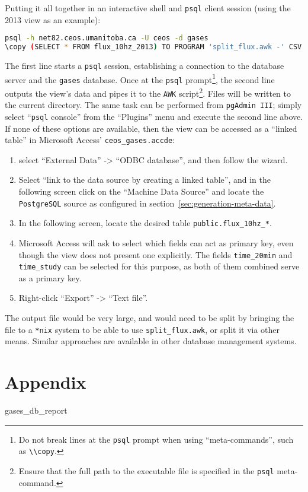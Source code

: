\documentclass[12pt,letterpaper,titlepage,headings=small,numbers=noenddot]%
{scrartcl}
\begin{document}
Putting it all together in an interactive shell and \texttt{psql} client
session (using the 2013 view as an example):

\begin{lstlisting}[language=bash, morekeywords={psql, copy},
backgroundcolor=\color{lightgray}, breaklines=true]
psql -h net82.ceos.umanitoba.ca -U ceos -d gases
\copy (SELECT * FROM flux_10hz_2013) TO PROGRAM 'split_flux.awk -' CSV
\end{lstlisting}

The first line starts a \texttt{psql} session, establishing a connection to
the database server and the \texttt{gases} database.  Once at the
\texttt{psql} prompt\footnote{Do not break lines at the \texttt{psql}
  prompt when using ``meta-commands'', such as \lstinline|\\copy|.}, the
second line outputs the view's data and pipes it to the \texttt{AWK}
script\footnote{Ensure that the full path to the executable file is
  specified in the \texttt{psql} meta-command.}.  Files will be written to
the current directory.  The same task can be performed from \texttt{pgAdmin
  III}; simply select ``\texttt{psql} console'' from the ``Plugins'' menu
and execute the second line above.  If none of these options are available,
then the view can be accessed as a ``linked table'' in Microsoft Access'
\texttt{ceos\_gases.accde}:

\begin{enumerate}[\bfseries 1.]
\item select ``External Data'' -> ``ODBC database'', and then follow the
  wizard.
\item Select ``link to the data source by creating a linked table'', and in
  the following screen click on the ``Machine Data Source'' and locate the
  \texttt{PostgreSQL} source as configured in
  section~\ref{sec:generation-meta-data}.
\item In the following screen, locate the desired table
  \texttt{public.flux\_10hz\_*}.
\item Microsoft Access will ask to select which fields can act as primary
  key, even though the view does not present one explicitly.  The fields
  \texttt{time\_20min} and \texttt{time\_study} can be selected for this
  purpose, as both of them combined serve as a primary key.
\item Right-click ``Export'' -> ``Text file''.
\end{enumerate}

The output file would be very large, and would need to be split by bringing
the file to a \texttt{*nix} system to be able to use
\texttt{split\_flux.awk}, or split it via other means.  Similar approaches
are available in other database management systems.






\appendix
\cleardoublepage
{}
{}
\pagestyle{plain}
\section*{Appendix}
\label{sec:appendix}

%
{gases_db_report}
\end{document}
